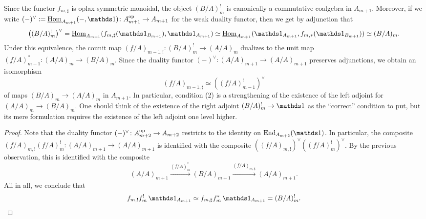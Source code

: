 \documentclass[11pt]{book}
\begin{document}
	Since the functor $f_{m,\sharp}$ is oplax symmetric monoidal, the object $(B/A)^!_m$ is canonically a commutative coalgebra in $A_{m+1}$. Moreover, if we write $(-)^{\vee} := \iHom_{A_{m+1}}(-, \unit) \colon A_{m+1}\catop \to A_{m+1}$ for the weak duality functor, then we get by adjunction that
	\[
		\bigl((B/A)^!_m\bigr)^{\vee} = \iHom_{A_{m+1}}(f_{m,\sharp}(\unit_{B_{m+1}}), \unit_{A_{m+1}}) \simeq \iHom_{A_{m+1}}(\unit_{A_{m+1}},f_{m,*}(\unit_{B_{m+1}})) \simeq (B/A)_m.
	\]
	Under this equivalence, the counit map $(f/A)_{m-1,!}\colon (B/A)^!_m \to (A/A)_m$ dualizes to the unit map $(f/A)^*_{m-1}\colon (A/A)_m \to (B/A)_m$. Since the duality functor $(-)^{\vee}\colon (A/A)_{m+1} \to (A/A)_{m+1}$ preserves adjunctions, we obtain an isomorphism
	\[
		(f/A)_{m-1,\sharp} \simeq ((f/A)^!_{m-1})^{\vee}
	\]
	of maps $(B/A)_m \to (A/A)_m$ in $A_{m+1}$. In particular, condition (2) is a strengthening of the existence of the left adjoint for $(A/A)_m \to (B/A)_m$. One should think of the existence of the right adjoint $(B/A)^!_m \to \unit$ as the ``correct'' condition to put, but its mere formulation requires the existence of the left adjoint one level higher.

	\begin{proof}
		Note that the duality functor $(-)^{\vee}\colon A_{m+2}^{\textup{op}} \to A_{m+2}$ restricts to the identity on $\End_{A_{m+2}}(\unit)$. In particular, the composite $(f/A)_{m,!}(f/A)_m^!\colon (A/A)_{m+1} \to (A/A)_{m+1}$ is identified with the composite $((f/A)_{m,!})^{\vee}((f/A)_m^!)^{\vee}$. By the previous observation, this is identified with the composite
		\[
			(A/A)_{m+1} \xrightarrow{(f/A)^*_{m}} (B/A)_{m+1} \xrightarrow{(f/A)_{m,\sharp}} (A/A)_{m+1}.
		\]
		All in all, we conclude that
		\[
			f_{m,!}f_m^!\unit_{A_{m+1}} \simeq f_{m,\sharp}f_m^*\unit_{A_{m+1}} = (B/A)^!_m.\qedhere
		\]
	\end{proof}
\end{document}
